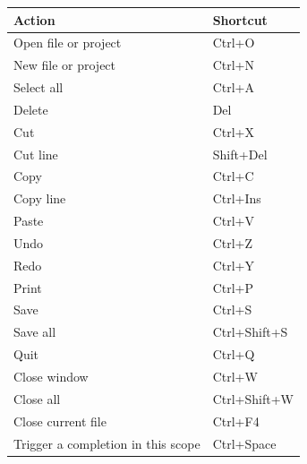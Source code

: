 \begin{frame}
\begin{columns}
       \begin{column}{0.5\textwidth}
       \begin{tabular}{|p{}|p{}|}
         \hline
         \textbf{Action} & \textbf{Shortcut} \\
         \hline
         Open file or project & Ctrl+O \\
         \hline
         New file or project & Ctrl+N \\
         \hline
         Select all & Ctrl+A \\
         \hline
         Delete & Del \\
         \hline
         Cut & Ctrl+X \\
         \hline
         Cut line & Shift+Del \\
         \hline
         Copy & Ctrl+C \\
         \hline
         Copy line & Ctrl+Ins \\
         \hline
         Paste & Ctrl+V \\
         \hline
         Undo & Ctrl+Z \\
         \hline
         Redo & Ctrl+Y \\
         \hline
         Print & Ctrl+P \\
         \hline
         Save & Ctrl+S \\
         \hline
         Save all & Ctrl+Shift+S \\
         \hline
         Quit & Ctrl+Q \\
         \hline
         Close window & Ctrl+W \\
         \hline
         Close all & Ctrl+Shift+W \\
         \hline
         Close current file & Ctrl+F4 \\
         \hline
         Trigger a completion in this scope & Ctrl+Space \\
         \hline
       \end{tabular}
       \end{column}
     \end{columns}
\end{frame}

